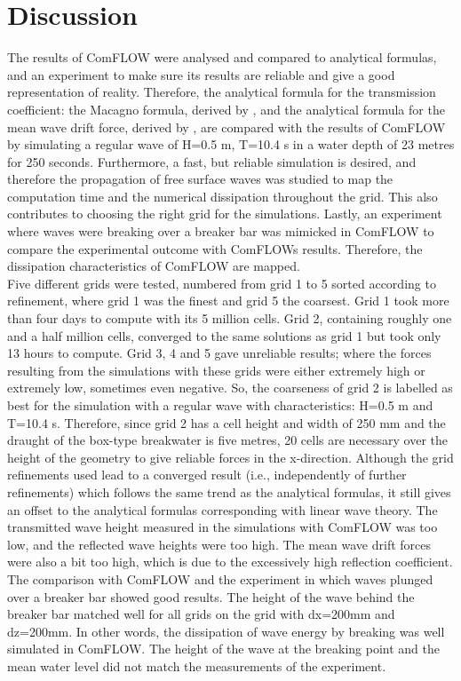 \section{Discussion}
The results of ComFLOW were analysed and compared to analytical formulas, and an experiment to make sure its results are reliable and give a good representation of reality. Therefore, the analytical formula for the transmission coefficient: the Macagno formula, derived by \citep{macagno1953fluid}, and the analytical formula for the mean wave drift force, derived by \citep{longuethiggins1977}, are compared with the results of ComFLOW by simulating a regular wave of H=0.5 m, T=10.4 s in a water depth of 23 metres for 250 seconds. Furthermore, a fast, but reliable simulation is desired, and therefore the propagation of free surface waves was studied to map the computation time and the numerical dissipation throughout the grid. This also contributes to choosing the right grid for the simulations. Lastly, an experiment where waves were breaking over a breaker bar was mimicked in ComFLOW to compare the experimental outcome with ComFLOWs results. Therefore, the dissipation characteristics of ComFLOW are mapped.
\\
Five different grids were tested, numbered from grid 1 to 5 sorted according to refinement, where grid 1 was the finest and grid 5 the coarsest. Grid 1 took more than four days to compute with its 5 million cells. Grid 2, containing roughly one and a half million cells, converged to the same solutions as grid 1 but took only 13 hours to compute. Grid 3, 4 and 5 gave unreliable results; where the forces resulting from the simulations with these grids were either extremely high or extremely low, sometimes even negative. So, the coarseness of grid 2 is labelled as best for the simulation with a regular wave with characteristics: H=0.5 m and T=10.4 s. Therefore, since grid 2 has a cell height and width of 250 mm and the draught of the box-type breakwater is five metres, 20 cells are necessary over the height of the geometry to give reliable forces in the x-direction. Although the grid refinements used lead to a converged result (i.e., independently of further refinements) which follows the same trend as the analytical formulas, it still gives an offset to the analytical formulas corresponding with linear wave theory. The transmitted wave height measured in the simulations with ComFLOW was too low, and the reflected wave heights were too high. The mean wave drift forces were also a bit too high, which is due to the excessively high reflection coefficient. \\
The comparison with ComFLOW and the experiment in which waves plunged over a breaker bar showed good results. The height of the wave behind the breaker bar matched well for all grids on the grid with dx=200mm and dz=200mm. In other words, the dissipation of wave energy by breaking was well simulated in ComFLOW. The height of the wave at the breaking point and the mean water level did not match the measurements of the experiment.

